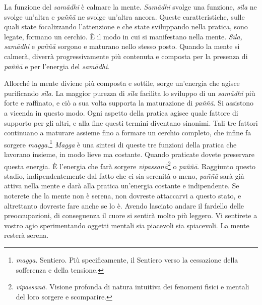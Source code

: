 La funzione del \emph{samādhi} è calmare la mente. \emph{Samādhi} svolge
una funzione, \emph{sīla} ne svolge un'altra e \emph{paññā} ne svolge
un'altra ancora. Queste caratteristiche, sulle quali state focalizzando
l'attenzione e che state sviluppando nella pratica, sono legate, formano
un cerchio. È il modo in cui si manifestano nella mente. \emph{Sīla,}
\emph{samādhi} e \emph{paññā} sorgono e maturano nello stesso posto.
Quando la mente si calmerà, diverrà progressivamente più contenuta e
composta per la presenza di \emph{paññā} e per l'energia del
\emph{samādhi}.

Allorché la mente diviene più composta e sottile, sorge un'energia che
agisce purificando \emph{sīla}. La maggior purezza di \emph{sīla}
facilita lo sviluppo di un \emph{samādhi} più forte e raffinato, e ciò a
sua volta supporta la maturazione di \emph{paññā}. Si assistono a
vicenda in questo modo. Ogni aspetto della pratica agisce quale fattore
di supporto per gli altri, e alla fine questi termini diventano
sinonimi. Tali tre fattori continuano a maturare assieme fino a formare
un cerchio completo, che infine fa sorgere \emph{magga}.\footnote{\emph{magga}.
  Sentiero. Più specificamente, il Sentiero verso la cessazione della
  sofferenza e della tensione.} \emph{Magga} è una sintesi di queste tre
funzioni della pratica che lavorano insieme, in modo lieve ma costante.
Quando praticate dovete preservare questa energia. È l'energia che farà
sorgere \emph{vipassanā}\footnote{\emph{vipassanā}. Visione profonda di
  natura intuitiva dei fenomeni fisici e mentali del loro sorgere e
  scomparire.} o \emph{paññā}. Raggiunto questo stadio,
indipendentemente dal fatto che ci sia serenità o meno, \emph{paññā}
sarà già attiva nella mente e darà alla pratica un'energia costante e
indipendente. Se noterete che la mente non è serena, non dovreste
attaccarvi a questo stato, e altrettanto dovreste fare anche se lo è.
Avendo lasciato andare il fardello delle preoccupazioni, di conseguenza
il cuore si sentirà molto più leggero. Vi sentirete a vostro agio
sperimentando oggetti mentali sia piacevoli sia spiacevoli. La mente
resterà serena.

